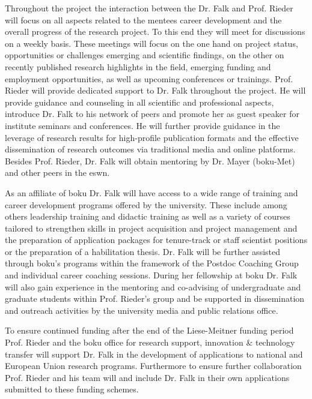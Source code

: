 Throughout the project the interaction between the Dr. Falk and Prof. Rieder will focus on all aspects related to the mentees career development and the overall progress of the research project. To this end they will meet for discussions on a weekly basis. These meetings will focus on the one hand on project status, opportunities or challenges emerging and scientific findings, on the other on recently published research highlights in the field, emerging funding and employment opportunities, as well as upcoming conferences or trainings. Prof. Rieder will provide dedicated support to Dr. Falk throughout the project. He will provide guidance and counseling in all scientific and professional aspects, introduce Dr. Falk to his network of peers and promote her as guest speaker for institute seminars and conferences. He will further provide guidance in the leverage of research results for high-profile publication formats and the effective dissemination of research outcomes via traditional media and online platforms. Besides Prof. Rieder, Dr. Falk will obtain mentoring by Dr. Mayer (\gls{boku}-Met) and other peers in the \gls{eswn}.

As an affiliate of \gls{boku} Dr. Falk will have access to a wide range of training and career development programs offered by the university. These include among others leadership training and didactic training as well as a variety of courses tailored to strengthen skills in project acquisition and project management and the preparation of application packages for tenure-track or staff scientist positions or the preparation of a habilitation thesis. Dr. Falk will be further assisted through \gls{boku}’s programs within the framework of the Postdoc Coaching Group and individual career coaching sessions. During her fellowship at \gls{boku} Dr. Falk will also gain experience in the mentoring and co-advising of undergraduate and graduate students within Prof. Rieder’s group and be supported in dissemination and outreach activities by the university media and public relations office.

To ensure continued funding after the end of the Liese-Meitner funding period Prof. Rieder and the \gls{boku} office for research support, innovation \& technology transfer will support Dr. Falk in the development of applications to national and European Union research programs. Furthermore to ensure further collaboration Prof. Rieder and his team will and include Dr. Falk in their own applications submitted to these funding schemes.
